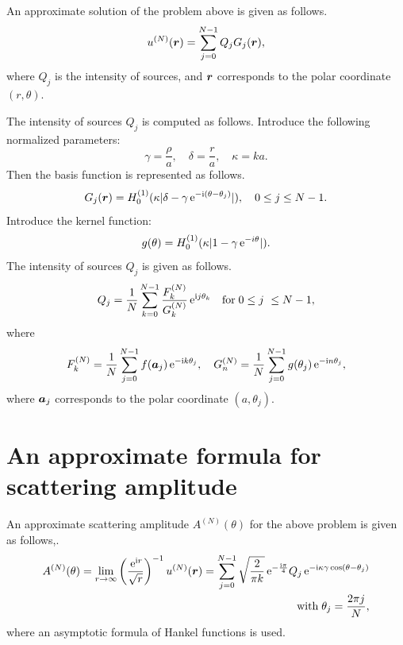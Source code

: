 \documentclass[12pt]{article}
\def\e{ \,{\rm e}}
\def\bfvec#1{\mbox{\boldmath$#1$}}
\begin{document}
An approximate solution of the problem above is given as follows\cite{ushijima-chiba 1}.
\begin{displaymath}
u^{(N)}(\bfvec{r})=\sum^{N-1}_{j=0} Q_j G_j(\bfvec{r}),
\end{displaymath}
where $Q_j$ is the intensity of sources, and $\bfvec{r}$ corresponds to the polar coordinate $(r,\theta)$.

The intensity of sources $Q_j$ is computed as follows.
Introduce the following normalized parameters:
\begin{displaymath}
\gamma = \frac{\rho}{a}, \quad 
\delta = \frac{r}{a}, \quad 
\kappa = ka.
\end{displaymath}
Then the basis function is represented as follows.
\begin{displaymath}
G_j({\bfvec{r}}) = H_0^{(1)}(\kappa|\delta- \gamma \e^{-\mathrm{i}(\theta -{\theta}_j)}|),
\quad 0 \leq j \leq N-1.
\nonumber
\end{displaymath}
Introduce the kernel function:
\begin{displaymath}
g(\theta)=H^{(1)}_0(\kappa|1-\gamma \e^{-i\theta}|).
\end{displaymath}
The intensity of sources $Q_j$ is given as follows.
\begin{displaymath}
Q_j=\frac{1}{N}\sum^{N-1}_{k=0}\frac{F^{(N)}_k}{G^{(N)}_k}\e^{\mathrm{i}j\theta_k} \quad {\rm for}\;0 \le j\ \le N-1,
\end{displaymath}
where
\begin{displaymath}
F^{(N)}_k = \frac{1}{N}\sum^{N-1}_{j=0}f(\bfvec{a}_j)\e^{-\mathrm{i}k\theta_j}, \quad G^{(N)}_n = \frac{1}{N}\sum^{N-1}_{j=0}g(\theta_j)\e^{-\mathrm{i}n\theta_j},
\end{displaymath}
where $\bfvec{a}_j$ corresponds to the polar coordinate $(a,\theta_j)$.


\section{An approximate formula for scattering amplitude}
An approximate scattering amplitude $A^{(N)}(\theta)$ for the above problem is given as follows\cite{chiba-ushijima 1},\cite{chiba-ushijima 2}.
\begin{eqnarray*}
A^{(N)}(\theta)=\lim_{r\rightarrow\infty}\left(\frac{\e^{\mathrm{i}r}}{\sqrt{r}}\right)^{-1}u^{(N)}(\bfvec{r})=\sum^{N-1}_{j=0} \sqrt{\frac{2}{\pi k}}\e^{-\frac{\mathrm{i}\pi}{4}}Q_j \e^{-\mathrm{i} \kappa \gamma \cos(\theta-\theta_j)} \\
\quad {\rm with}\;\theta_j=\frac{2\pi j}{N},
\label{A^(N)}
\end{eqnarray*}
where an asymptotic formula of Hankel functions\cite{Abramowitz-Stegun} is used.
\end{document}
